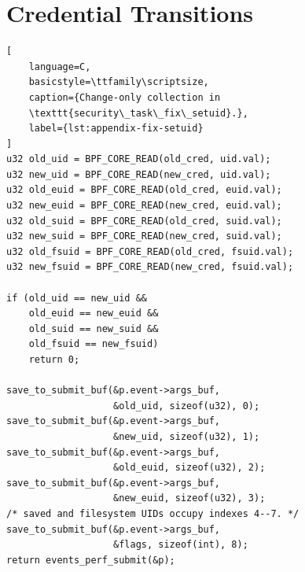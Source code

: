 \section{Credential Transitions}
\label{sec:appendix-credential-transition}

\begin{lstlisting}[
    language=C,
    basicstyle=\ttfamily\scriptsize,
    caption={Change-only collection in
    \texttt{security\_task\_fix\_setuid}.},
    label={lst:appendix-fix-setuid}
]
u32 old_uid = BPF_CORE_READ(old_cred, uid.val);
u32 new_uid = BPF_CORE_READ(new_cred, uid.val);
u32 old_euid = BPF_CORE_READ(old_cred, euid.val);
u32 new_euid = BPF_CORE_READ(new_cred, euid.val);
u32 old_suid = BPF_CORE_READ(old_cred, suid.val);
u32 new_suid = BPF_CORE_READ(new_cred, suid.val);
u32 old_fsuid = BPF_CORE_READ(old_cred, fsuid.val);
u32 new_fsuid = BPF_CORE_READ(new_cred, fsuid.val);

if (old_uid == new_uid &&
    old_euid == new_euid &&
    old_suid == new_suid &&
    old_fsuid == new_fsuid)
    return 0;

save_to_submit_buf(&p.event->args_buf,
                   &old_uid, sizeof(u32), 0);
save_to_submit_buf(&p.event->args_buf,
                   &new_uid, sizeof(u32), 1);
save_to_submit_buf(&p.event->args_buf,
                   &old_euid, sizeof(u32), 2);
save_to_submit_buf(&p.event->args_buf,
                   &new_euid, sizeof(u32), 3);
/* saved and filesystem UIDs occupy indexes 4--7. */
save_to_submit_buf(&p.event->args_buf,
                   &flags, sizeof(int), 8);
return events_perf_submit(&p);
\end{lstlisting}
